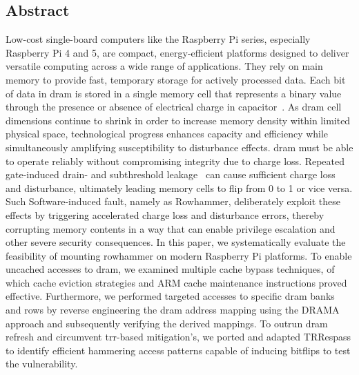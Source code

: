 \begin{titlepage}
    \section*{Abstract}
        Low-cost single-board computers like the Raspberry Pi series, especially 
        Raspberry Pi 4 and 5, are compact, energy-efficient platforms designed 
        to deliver versatile computing across a wide range of applications. They 
        rely on main memory to provide fast, temporary storage for actively processed 
        data. Each bit of data in \gls{dram} is stored in a single memory cell that 
        represents a binary value through the presence or absence of electrical 
        charge in capacitor~\cite{paperFlippingBits, paperRowhammeronaRPi, paperDrammer}.
        As \gls{dram} cell dimensions continue to shrink in order to increase memory 
        density within limited physical space, technological progress enhances 
        capacity and efficiency while simultaneously amplifying susceptibility 
        to disturbance effects. \gls{dram} must be able to operate reliably without 
        compromising integrity due to charge loss. Repeated gate-induced 
        drain- and subthreshold leakage~\cite{paperFlippingBits, paperRHinDRAM} can cause sufficient charge 
        loss and disturbance, ultimately leading memory cells to flip 
        from 0 to 1 or vice versa. Such Software-induced fault, namely as 
        Rowhammer, deliberately exploit these effects by triggering accelerated 
        charge loss and disturbance errors, thereby corrupting memory contents 
        in a way that can enable privilege escalation and other severe security 
        consequences.
        In this paper, we systematically evaluate the feasibility of mounting 
        rowhammer on modern Raspberry Pi platforms. To enable uncached accesses 
        to \gls{dram}, we examined multiple cache bypass techniques, of which cache 
        eviction strategies and ARM cache maintenance instructions proved effective. 
        Furthermore, we performed targeted accesses to specific \gls{dram} banks and 
        rows by reverse engineering the \gls{dram} address mapping using the DRAMA 
        approach and subsequently verifying the derived mappings.
        To outrun \gls{dram} refresh and circumvent \gls{trr}-based mitigation's, we ported 
        and adapted TRRespass to identify efficient hammering access patterns 
        capable of inducing bitflips to test the vulnerability.

\end{titlepage}
